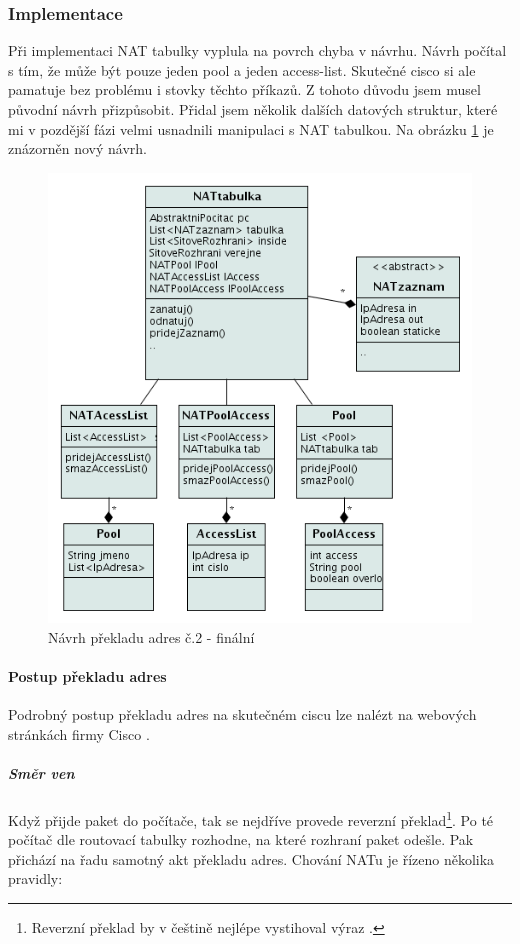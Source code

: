 \subsubsection{Implementace}
Při implementaci NAT tabulky vyplula na povrch chyba v návrhu. Návrh počítal s tím, že může být pouze jeden pool a jeden access-list. Skutečné cisco si ale pamatuje bez problému i stovky těchto příkazů. Z tohoto důvodu jsem musel původní návrh přizpůsobit. Přidal jsem několik dalších datových struktur, které mi v pozdější fázi velmi usnadnili manipulaci s NAT tabulkou. Na obrázku \ref{fig:nat_navrh2} je znázorněn nový návrh.

\begin{figure}[b]
\begin{center}
\includegraphics[width=12cm]{figures/nat_navrh2}
\caption{Návrh překladu adres č.2 - finální}
\label{fig:nat_navrh2}
\end{center}
\end{figure}

\paragraph{Postup překladu adres}
Podrobný postup překladu adres na skutečném ciscu lze nalézt na webových stránkách firmy Cisco \cite{cisco:postup}.

\subparagraph{Směr ven}
Když přijde paket do počítače, tak se nejdříve provede reverzní překlad\footnote{Reverzní překlad by v češtině nejlépe vystihoval výraz .}. Po té počítač dle routovací tabulky rozhodne, na které rozhraní paket odešle. Pak přichází na řadu samotný akt překladu adres. Chování NATu je řízeno několika pravidly:

